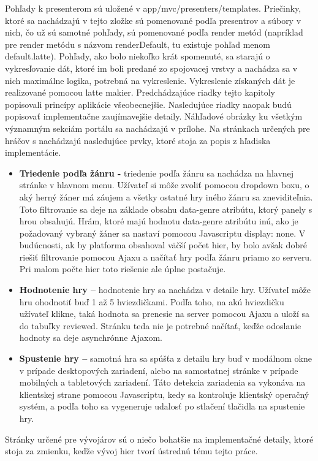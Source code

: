 Pohľady k presenterom sú uložené v app/mvc/presenters/templates. Priečinky, ktoré sa nachádzajú v tejto zložke sú pomenované podľa presentrov a súbory v nich, čo už sú samotné pohľady, sú pomenované podľa render metód (napríklad pre render metódu s názvom renderDefault, tu existuje pohľad menom default.latte). Pohľady, ako bolo niekoľko krát spomenuté, sa starajú o vykresľovanie dát, ktoré im boli predané zo spojovacej vrstvy a nachádza sa v nich maximálne logika, potrebná na vykreslenie. Vykreslenie získaných dát je realizované pomocou latte makier. 
Predchádzajúce riadky tejto kapitoly popisovali princípy aplikácie všeobecnejšie. Nasledujúce riadky naopak budú popisovať implementačne zaujímavejšie detaily. Náhľadové obrázky ku všetkým významným sekciám portálu sa nachádzajú v prílohe. Na stránkach určených pre hráčov s nachádzajú nasledujúce prvky, ktoré stoja za popis z hľadiska implementácie.
\begin{itemize}  
\item \textbf{Triedenie podľa žánru -}  triedenie podľa žánru sa nachádza na hlavnej stránke v hlavnom menu. Užívateľ si môže zvoliť pomocou dropdown boxu, o aký herný žáner má záujem a všetky ostatné hry iného žánru sa zneviditeľnia. Toto filtrovanie sa deje na základe obsahu data-genre atribútu, ktorý panely s hrou obsahujú. Hrám, ktoré majú hodnotu data-genre atribútu inú, ako je požadovaný vybraný žáner sa nastaví pomocou Javascriptu display: none. V budúcnosti, ak by platforma obsahoval väčší počet hier,  by bolo avšak dobré riešiť filtrovanie pomocou Ajaxu a načítať hry podľa žánru  priamo zo serveru. Pri malom počte hier toto riešenie ale úplne postačuje.
\item \textbf{Hodnotenie hry –} hodnotenie hry sa nachádza v detaile hry. Užívateľ môže hru ohodnotiť buď 1 až 5 hviezdičkami. Podľa toho, na akú hviezdičku užívateľ klikne, taká hodnota sa prenesie na server pomocou Ajaxu a uloží sa do tabuľky reviewed. Stránku teda nie je potrebné načítať, keďže odoslanie hodnoty sa deje asynchrónne Ajaxom.
\item \textbf{Spustenie hry –} samotná hra sa spúšťa z detailu hry buď v modálnom okne v prípade desktopových zariadení, alebo na samostatnej stránke v prípade mobilných a tabletových zariadení. Táto detekcia zariadenia sa vykonáva na klientskej strane pomocou Javascriptu, kedy sa kontroluje klientský operačný systém, a podľa toho sa vygeneruje udalosť po stlačení tlačidla na spustenie hry.
\end{itemize}
Stránky určené pre vývojárov sú o niečo bohatšie na implementačné detaily, ktoré stoja za zmienku, keďže vývoj hier tvorí ústrednú tému tejto práce.  

